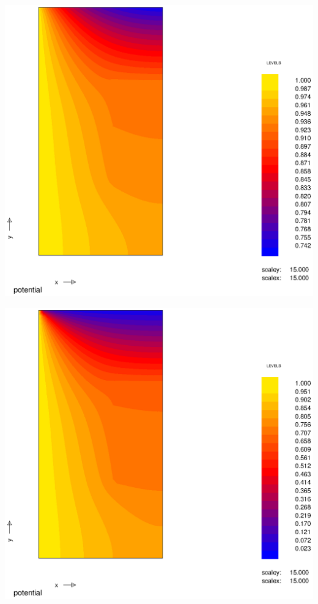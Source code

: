 \begin{Figure}
 \centerfloat
 \includegraphics[width=0.8\linewidth]{coef_001.eps}
 \label{fig:coef_0.01}
\end{Figure}

\begin{Figure}
 \centerfloat
 \includegraphics[width=0.8\linewidth]{coef_10.eps}
 \label{fig:coef_10}
\end{Figure}